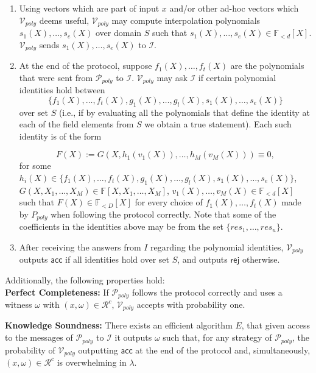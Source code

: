 \begin{definition}
\begin{enumerate}
\item 
Using vectors which are part of input $x$ and/or other ad-hoc vectors which $\mathcal{V}_{poly}$ deems useful, $\mathcal{V}_{poly}$ 
may compute interpolation polynomials $s_1(X), \ldots, s_e(X)$ over domain $S$ such that $s_1(X), \ldots, s_e(X) \in \mathbb{F}_{<d}[X]$. 
$\mathcal{V}_{poly}$ sends $s_1(X), \ldots, s_e(X)$ to $\mathcal{I}$. 

\item 
At the end of the protocol, suppose $f_1(X), \ldots, f_t(X)$ are the polynomials that were sent from $\mathcal{P}_{poly}$ to 
$\mathcal{I}$. $\mathcal{V}_{poly}$ may ask $\mathcal{I}$ if certain polynomial identities hold between 
$$\{f_1(X), \ldots , f_t(X), g_1(X), \ldots, g_l(X), s_1(X), \ldots, s_e(X) \}$$ over set $S$ 
(i.e., if by evaluating all the polynomials that define the identity at each of the field elements from $S$ 
we obtain a true statement). Each such identity is of the form 

$$F(X) := G(X, h_1(v_1(X)), \dots , h_M(v_M(X))) \equiv 0,$$
for some $h_i(X) \in \{f_1(X), \ldots , f_t(X), g_1(X), \ldots , g_l(X), s_1(X), \ldots, s_e(X) \}$, \\ $G(X, X_1, \ldots, X_M) \in \mathbb{F}[X, X_1, \ldots , X_M]$, 
$v_1(X), \ldots , v_M(X) \in  \mathbb{F}_{<d}[X]$ such that $F(X) \in \mathbb{F}_{<D}[X]$ for every choice of 
$f_1(X), \ldots, f_t(X)$ made by $P_{poly}$ when following the protocol correctly. Note that some of the coefficients in the identities above may be 
from the set $\{\mathit{res_1}, \ldots, \mathit{res_u}\}$.
\item After receiving the answers from $I$ regarding the polynomial identities, 
$\mathcal{V}_{poly}$ outputs $\mathsf{acc}$ if all identities hold over set $S$, 
and outputs $\mathsf{rej}$ otherwise.
\end{enumerate}

\noindent Additionally, the following properties hold: \\

\noindent \textbf{Perfect Completeness:} If $\mathcal{P}_{poly}$ follows the protocol correctly and uses a witness $\omega$ with 
$(x, \omega) \in \mathcal{R}^c$, $\mathcal{V}_{poly}$ accepts with probability one.

\noindent \textbf{Knowledge Soundness:} There exists an efficient algorithm $E$, that given access to the messages of $\mathcal{P}_{poly}$ 
to $\mathcal{I}$ it outputs $\omega$ such that, for any strategy of $\mathcal{P}_{poly}$, the probability of $\mathcal{V}_{poly}$ 
outputting $\mathsf{acc}$ at the end of the protocol and, simultaneously, $(x, \omega) \in \mathcal{R}^c$ is overwhelming in $\lambda$.

\end{definition}

